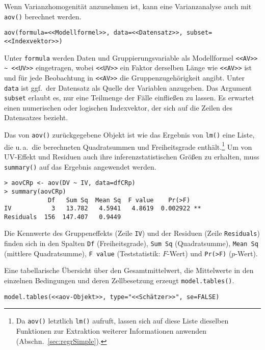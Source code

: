 Wenn Varianzhomogenität anzunehmen ist, kann eine Varianzanalyse auch mit \lstinline!aov()! berechnet werden.
\begin{lstlisting}
aov(formula=<<Modellformel>>, data=<<Datensatz>>, subset=<<Indexvektor>>)
\end{lstlisting}

Unter \lstinline!formula! werden Daten und Gruppierungsvariable als Modellformel \lstinline!<<AV>> ~ <<UV>>! eingetragen, wobei \lstinline!<<UV>>! ein Faktor derselben Länge wie \lstinline!<<AV>>! ist und für jede Beobachtung in \lstinline!<<AV>>! die Gruppenzugehörigkeit angibt. Unter \lstinline!data! ist ggf.\ der Datensatz als Quelle der Variablen anzugeben. Das Argument \lstinline!subset! erlaubt es, nur eine Teilmenge der Fälle einfließen zu lassen. Es erwartet einen numerischen oder logischen Indexvektor, der sich auf die Zeilen des Datensatzes bezieht.

Das von \lstinline!aov()! zurückgegebene Objekt ist wie das Ergebnis von \lstinline!lm()! eine Liste, die u.\,a.\ die berechneten Quadratsummen und Freiheitsgrade enthält.\footnote{Da \lstinline!aov()! letztlich \lstinline!lm()! aufruft, lassen sich auf diese Liste dieselben Funktionen zur Extraktion weiterer Informationen anwenden (Abschn.\ \ref{sec:regrSimple}).} Um von UV-Effekt und Residuen auch ihre inferenzstatistischen Größen zu erhalten, muss \lstinline!summary()! auf das Ergebnis angewendet werden.
\begin{lstlisting}
> aovCRp <- aov(DV ~ IV, data=dfCRp)
> summary(aovCRp)
            Df   Sum Sq  Mean Sq  F value    Pr(>F)
IV           3   13.782   4.5941   4.8619  0.002922 **
Residuals  156  147.407   0.9449
\end{lstlisting}

Die Kennwerte des Gruppeneffekts (Zeile \lstinline!IV!) und der Residuen (Zeile \lstinline!Residuals!) finden sich in den Spalten \lstinline!Df! (Freiheitsgrade), \lstinline!Sum Sq! (Quadratsumme), \lstinline!Mean Sq! (mittlere Quadratsumme), \lstinline!F value! (Teststatistik: $F$-Wert) und \lstinline!Pr(>F)! ($p$-Wert).

Eine tabellarische Übersicht über den Gesamtmittelwert, die Mittelwerte in den einzelnen Bedingungen und deren Zellbesetzung erzeugt \lstinline!model.tables()!.
\begin{lstlisting}
model.tables(<<aov-Objekt>>, type="<<Schätzer>>", se=FALSE)
\end{lstlisting}

